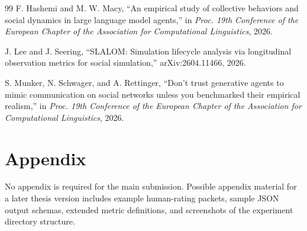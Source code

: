 \documentclass[11pt]{article}
\begin{document}
\begin{thebibliography}{99}
F. Hashemi and M. W. Macy, ``An empirical study of collective behaviors and social dynamics in large language model agents,'' in \emph{Proc. 19th Conference of the European Chapter of the Association for Computational Linguistics}, 2026.

J. Lee and J. Seering, ``SLALOM: Simulation lifecycle analysis via longitudinal observation metrics for social simulation,'' arXiv:2604.11466, 2026.

S. Munker, N. Schwager, and A. Rettinger, ``Don't trust generative agents to mimic communication on social networks unless you benchmarked their empirical realism,'' in \emph{Proc. 19th Conference of the European Chapter of the Association for Computational Linguistics}, 2026.

\end{thebibliography}

\section*{Appendix}
No appendix is required for the main submission. Possible appendix material for a later thesis version includes example human-rating packets, sample JSON output schemas, extended metric definitions, and screenshots of the experiment directory structure.
\end{document}
